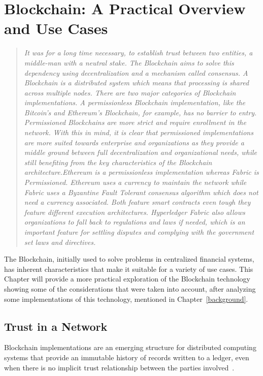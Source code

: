 \chapter{Blockchain: A Practical Overview and Use Cases}\label{blockchain}

\begin{quote} 
  \emph{It was for a long time necessary, to establish trust between two
  entities, a middle-man with a neutral stake. The Blockchain aims to solve
  this dependency using decentralization and a mechanism called consensus. A
  Blockchain is a distributed system which means that processing is shared
  across multiple nodes. There are two major categories of Blockchain
  implementations. A permissionless Blockchain implementation, like the
  Bitcoin's and Ethereum's Blockchain, for example, has no barrier to entry.
  Permissioned Blockchains are more strict and require enrollment in the
  network. With this in mind, it is clear that permissioned implementations are
  more suited towards enterprise and organizations as they provide a middle
  ground between full decentralization and organizational needs, while still
  benefiting from the key characteristics of the Blockchain
  architecture.Ethereum is a permissionless implementation whereas Fabric is
  Permissioned. Ethereum uses a currency to maintain the network while Fabric
  uses a Byzantine Fault Tolerant consensus algorithm which does not need a
  currency associated. Both feature smart contracts even tough they feature
  different execution architectures. Hyperledger Fabric also allows
  organizations to fall back to regulations and laws if needed, which is an
  important feature for settling disputes and complying with the government set
  laws and directives.}
\end{quote}

The Blockchain, initially used to solve problems in centralized financial
systems, has inherent characteristics that make it suitable for a variety of
use cases. This Chapter will provide a more practical exploration of the
Blockchain technology showing some of the considerations that were taken into
account, after analyzing some implementations of this technology, mentioned in
Chapter~\ref{background}.

\section{Trust in a Network}

Blockchain implementations are an emerging structure for distributed computing
systems that provide an immutable history of records written to a ledger, even
when there is no implicit trust relationship between the parties
involved~\cite{Barclay2017}.

